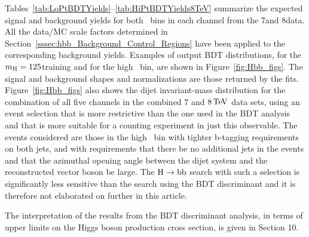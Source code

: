 \documentclass[11pt,twoside,a4paper,cmspaper,final,collab]{cms-tdr}
\begin{document}
Tables~\ref{tab:LoPtBDTYields}--\ref{tab:HiPtBDTYields8TeV} summarize the expected
signal and background yields for both \ptV\ bins in each channel from the 7\TeV and 8\TeV data.
All the data/MC scale factors determined in
Section~\ref{sssec:hbb_Background_Control_Regions} have been applied to the corresponding
background yields. Examples of output BDT distributions, for the $m_{\mathrm{H}}=125$\GeV training and
for the high \ptV\ bin, are shown in Figure~\ref{fig:Hbb_figs}. The
signal and background shapes and normalizations are those returned by
the fits. Figure~\ref{fig:Hbb_figs} also shows the
dijet invariant-mass distribution for the combination of all five channels in the
combined $7$ and $8\,\text{Te\hspace{-.08em}V}$ data sets, using an event selection that is more
restrictive than the one used in the BDT analysis and that is more
suitable for a counting experiment in just this observable. The events considered
are those in the high \ptV\ bin with tighter b-tagging requirements on
both jets, and with requirements that there be no additional jets in
the events and that the azimuthal opening angle between the
dijet system and the reconstructed vector boson be large. The
$\mathrm{H}\to\mathrm{b}\mathrm{b}$ search
with such a selection is significantly less sensitive
than the search using the BDT discriminant and it is therefore not
elaborated on further in this article.


The interpretation of the results from the BDT discriminant analysis, in terms of upper limits on the
Higgs boson production cross section, is given in Section 10.
\end{document}
